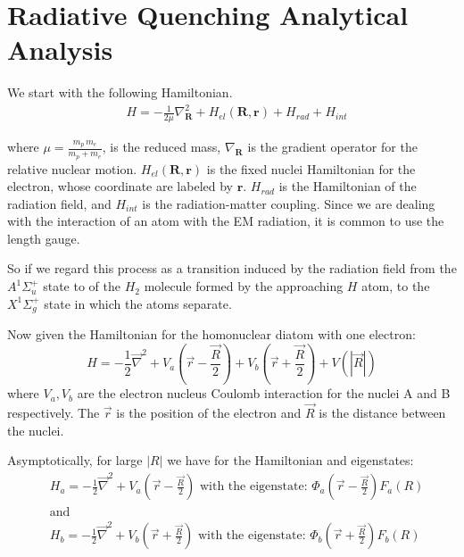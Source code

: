 \section{Radiative Quenching Analytical Analysis}

We start with the following Hamiltonian.
\begin{equation}\label{eqH1} 
\begin{split} 
& H = -\frac{1}{2\mu}\nabla^2_{\mathbf{R}} + H_{el}(\mathbf{R},\mathbf{r}) + H_{rad} + H_{int} 
\end{split} 
\end{equation} 

where $ \mu = \frac{m_p\,m_e}{m_p + m_e} $, is the reduced mass, $ \nabla_{\mathbf{R}} $ is the gradient operator for the relative nuclear motion. $ H_{el}(\mathbf{R},\mathbf{r}) $ is the fixed nuclei Hamiltonian for the electron, whose coordinate are labeled by $ \mathbf{r} $. $ H_{rad} $ is the Hamiltonian of the radiation field, and $ H_{int} $ is the radiation-matter coupling. Since we are dealing with the interaction of an atom with the EM radiation, it is common to use the length gauge.  

So if we regard this process as a transition induced by the radiation field from the $ A^{1}\Sigma^{+}_u $ state to of the $ H_2 $ molecule formed by the approaching $ H $ atom, to the $ X^{1}\Sigma^{+}_g $ state in which the atoms separate.

Now given the Hamiltonian for the homonuclear diatom with one electron:
\begin{equation}\label{hdia}
  H = -\frac{1}{2}\vec{\nabla}^2 + V_a(\vec{r} - \frac{\vec{R}}{2}) + V_b(\vec{r} + \frac{\vec{R}}{2}) + V(|\vec{R}|) 
\end{equation}
where $ V_a, V_b $ are the electron nucleus Coulomb interaction for the nuclei A and B respectively. The $ \vec{r} $ is the position of the electron and $ \vec{R} $ is the distance between the nuclei.

Asymptotically, for large $ |R| $ we have for the Hamiltonian and eigenstates:
\begin{equation}
\begin{split} 
  & H_a = -\frac{1}{2}\vec{\nabla}^2 + V_a(\vec{r} - \frac{\vec{R}}{2}) \text{ with the eigenstate: } \Phi_a(\vec{r} - \frac{\vec{R}}{2}) F_a(R) \\
  & \text{and} \\
  & H_b = -\frac{1}{2}\vec{\nabla}^2 + V_b(\vec{r} + \frac{\vec{R}}{2}) \text{ with the eigenstate: } \Phi_b(\vec{r} + \frac{\vec{R}}{2}) F_b(R) \\
\end{split} 
\end{equation}

